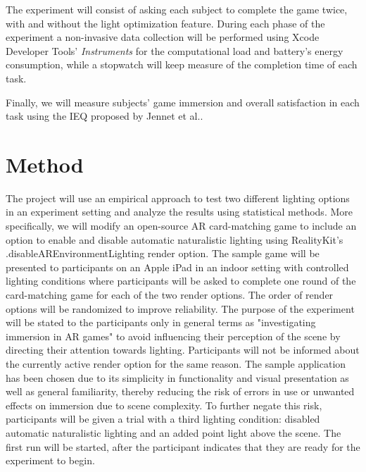 \documentclass[12pt,twoside,english]{article}
\begin{document}
The experiment will consist of asking each subject to complete the game twice, with and without the light optimization feature.
During each phase of the experiment a non-invasive data collection will be performed using Xcode Developer Tools' \emph{Instruments} for the computational load and battery's energy consumption, while a stopwatch will keep measure of the completion time of each task.

Finally, we will measure subjects' game immersion and overall satisfaction in each task using the \gls{IEQ} proposed by Jennet et al.\cite{jennett_measuring_2008}.

\section{Method}
\label{sect:method}

The project will use an empirical approach to test two different lighting options in an experiment setting and analyze the results using statistical methods.
More specifically, we will modify an open-source \gls{AR} card-matching game \cite{cobb_maxxfrazerrealitykit-cardflip_2020} to include an option to enable and disable automatic naturalistic lighting using RealityKit's \textsf{.disableAREnvironmentLighting} render option.
The sample game will be presented to participants on an Apple iPad in an indoor setting with controlled lighting conditions where participants will be asked to complete one round of the card-matching game for each of the two render options.
The order of render options will be randomized to improve reliability.
The purpose of the experiment will be stated to the participants only in general terms as "investigating immersion in \gls{AR} games" to avoid influencing their perception of the scene by directing their attention towards lighting.
Participants will not be informed about the currently active render option for the same reason.
The sample application has been chosen due to its simplicity in functionality and visual presentation as well as general familiarity, thereby reducing the risk of errors in use or unwanted effects on immersion due to scene complexity.
To further negate this risk, participants will be given a trial with a third lighting condition: disabled automatic naturalistic lighting and an added point light above the scene.
The first run will be started, after the participant indicates that they are ready for the experiment to begin.
\end{document}
